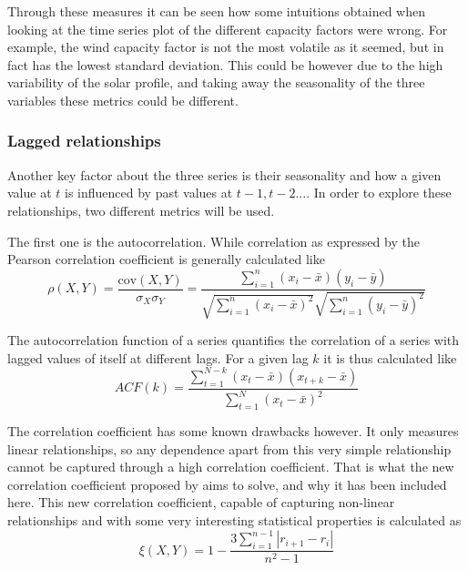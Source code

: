 Through these measures it can be seen how some intuitions obtained when looking at the time series plot of the different capacity factors were wrong. For example, the wind capacity factor is not the most volatile as it seemed, but in fact has the lowest standard deviation. This could be however due to the high variability of the solar profile, and taking away the seasonality of the three variables these metrics could be different.

\subsubsection{Lagged relationships}
\label{sec:lagged-relationships}
Another key factor about the three series is their seasonality and how a given value at $t$ is influenced by past values at $t-1, t-2...$. In order to explore these relationships, two different metrics will be used. 

The first one is the autocorrelation. While correlation as expressed by the Pearson correlation coefficient is generally calculated like
\begin{equation}
    \rho{\left(X,Y\right)}=\frac{\text{cov}\left(X,Y\right)}{\sigma_X\sigma_Y}=\frac{\sum^n_{i=1}\left(x_i-\bar{x}\right)\left(y_i-\bar{y}\right)}{\sqrt{\sum^n_{i=1}\left(x_i-\bar{x}\right)^2}\sqrt{\sum^n_{i=1}\left(y_i-\bar{y}\right)^2}}
\end{equation} 

The autocorrelation function of a series quantifies the correlation of a series with lagged values of itself at different lags. For a given lag $k$ it is thus calculated like
\begin{equation}
    \label{eq:acf}
    ACF\left(k\right)=\frac{\sum^{N-k}_{t=1}\left(x_t-\bar{x}\right)\left(x_{t+k}-\bar{x}\right)}{\sum^{N}_{t=1}\left(x_t-\bar{x}\right)^2}
\end{equation} 

The correlation coefficient has some known drawbacks however. It only measures linear relationships, so any dependence apart from this very simple relationship cannot be captured through a high correlation coefficient. That is what the new correlation coefficient proposed by \cite{correlation_2021} aims to solve, and why it has been included here. This new correlation coefficient, capable of capturing non-linear relationships and with some very interesting statistical properties is calculated as 
\begin{equation}
    \xi{\left(X,Y\right)}=1-\frac{3\sum_{i=1}^{n-1}\left|r_{i+1}-r_i\right|}{n^2-1}
\end{equation}

